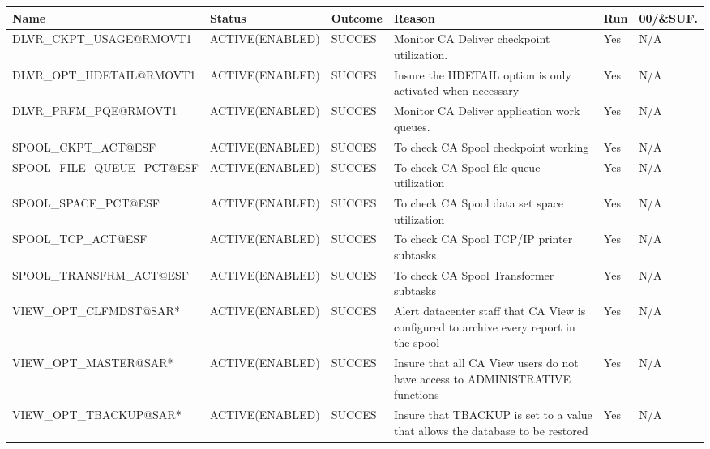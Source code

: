 \begin{landscape}
	\begin{table}[h]
		\begin{tabular}{|l|l|l|p{4.5cm}|l|l|}
			\hline
			\textbf{Name}               & \textbf{Status} & \textbf{Outcome} & \textbf{Reason}                                                                            & \textbf{Run} & \textbf{00/\&SUF.} \\ \hline
			DLVR\_CKPT\_USAGE@RMOVT1    & ACTIVE(ENABLED) & SUCCES           & Monitor   CA Deliver checkpoint utilization.                                               & Yes          & N/A                \\ \hline
			DLVR\_OPT\_HDETAIL@RMOVT1   & ACTIVE(ENABLED) & SUCCES           & Insure   the HDETAIL option is only activated when necessary                               & Yes          & N/A                \\ \hline
			DLVR\_PRFM\_PQE@RMOVT1      & ACTIVE(ENABLED) & SUCCES           & Monitor   CA Deliver application work queues.                                              & Yes          & N/A                \\ \hline
			SPOOL\_CKPT\_ACT@ESF        & ACTIVE(ENABLED) & SUCCES           & To   check CA Spool checkpoint working                                                     & Yes          & N/A                \\ \hline
			SPOOL\_FILE\_QUEUE\_PCT@ESF & ACTIVE(ENABLED) & SUCCES           & To   check CA Spool file queue utilization                                                 & Yes          & N/A                \\ \hline
			SPOOL\_SPACE\_PCT@ESF       & ACTIVE(ENABLED) & SUCCES           & To   check CA Spool data set space utilization                                             & Yes          & N/A                \\ \hline
			SPOOL\_TCP\_ACT@ESF         & ACTIVE(ENABLED) & SUCCES           & To   check CA Spool TCP/IP printer subtasks                                                & Yes          & N/A                \\ \hline
			SPOOL\_TRANSFRM\_ACT@ESF    & ACTIVE(ENABLED) & SUCCES           & To   check CA Spool Transformer subtasks                                                   & Yes          & N/A                \\ \hline
			VIEW\_OPT\_CLFMDST@SAR*     & ACTIVE(ENABLED) & SUCCES           & Alert   datacenter staff that CA View is configured to archive every report in the   spool & Yes          & N/A                \\ \hline
			VIEW\_OPT\_MASTER@SAR*      & ACTIVE(ENABLED) & SUCCES           & Insure   that all CA View users do not have access to ADMINISTRATIVE functions             & Yes          & N/A                \\ \hline
			VIEW\_OPT\_TBACKUP@SAR*     & ACTIVE(ENABLED) & SUCCES           & Insure   that TBACKUP is set to a value that allows the database to be restored            & Yes          & N/A                \\ \hline
		\end{tabular}
	\end{table}
\end{landscape}


